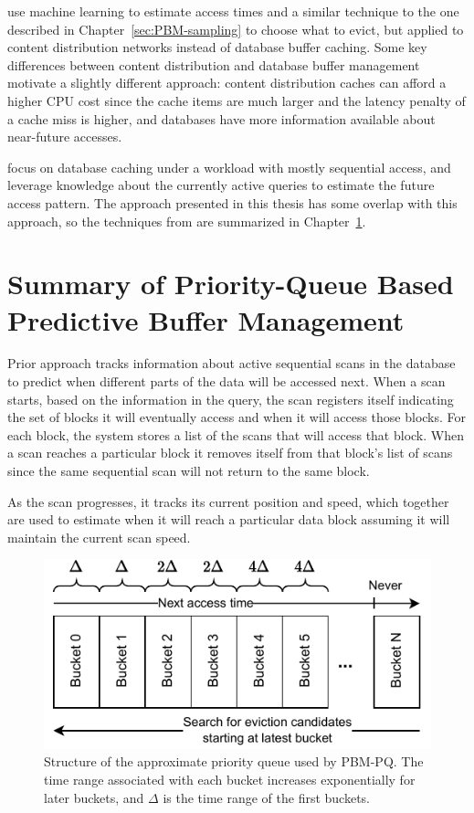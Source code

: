 \citet{relaxedBelady} use machine learning to estimate access times and a similar technique to the one described in Chapter~\ref{sec:PBM-sampling} to choose what to evict, but applied to content distribution networks instead of database buffer caching. Some key differences between content distribution and database buffer management motivate a slightly different approach: content distribution caches can afford a higher CPU cost since the cache items are much larger and the latency penalty of a cache miss is higher, and databases have more information available about near-future accesses.

\citet{pbm} focus on database caching under a workload with mostly sequential access, and leverage knowledge about the currently active queries to estimate the future access pattern. The approach presented in this thesis has some overlap with this approach, so the techniques from \cite{pbm} are summarized in Chapter~\ref{sec:pbm-pq_summary}.

\section{Summary of Priority-Queue Based Predictive Buffer Management}
\label{sec:pbm-pq_summary}

Prior approach \cite{pbm} tracks information about active sequential scans in the database to predict when different parts of the data will be accessed next.
When a scan starts, based on the information in the query, the scan registers itself indicating the set of blocks it will eventually access and when it will access those blocks. For each block, the system stores a list of the scans that will access that block. When a scan reaches a particular block it removes itself from that block's list of scans since the same sequential scan will not return to the same block.

As the scan progresses, it tracks its current position and speed, which together are used to estimate when it will reach a particular data block assuming it will maintain the current scan speed.

\begin{figure}
    \centering
    \includegraphics[width=1\columnwidth]{figures/Diagrams/diagrams-approx-PQ.pdf}
    \caption{Structure of the approximate priority queue used by PBM-PQ. The time range associated with each bucket increases exponentially for later buckets, and $\Delta$ is the time range of the first buckets.}
    \label{fig:approx-pq}
\end{figure}

